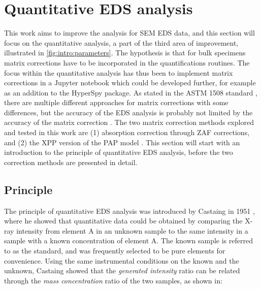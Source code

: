 \section{Quantitative EDS analysis}
\label{theory:quantitative}

This work aims to improve the analysis for SEM EDS data, and this section will focus on the quantitative analysis, a part of the third area of improvement, illustrated in \cref{fig:intro:parameters}.
The hypothesis is that for bulk specimens matrix corrections have to be incorporated in the quantifications routines.
The focus within the quantitative analysis has thus been to implement matrix corrections in a Jupyter notebook which could be developed further, for example as an addition to the HyperSpy package.
As stated in the ASTM 1508 standard \cite{astm_e1508_eds_quantification}, there are multiple different approaches for matrix corrections with some differences, but the accuracy of the EDS analysis is probably not limited by the accuracy of the matrix correction \cite{astm_e1508_eds_quantification}.
The two matrix correction methods explored and tested in this work are (1) absorption correction through ZAF corrections, and (2) the XPP version of the PAP model \cite{pap_1991}.
This section will start with an introduction to the principle of quantitative EDS analysis, before the two correction methods are presented in detail.






\subsection{Principle}
\label{theory:quantitative:principle}

The principle of quantitative EDS analysis was introduced by Castaing in 1951 \cite{castaing_1951}, where he showed that quantitative data could be obtained by comparing the X-ray intensity from element A in an unknown sample to the same intensity in a sample with a known concentration of element A.
The known sample is referred to as the standard, and was frequently selected to be pure elements for convenience.
Using the same instrumental conditions on the known and the unknown, Castaing showed that the \emph{generated intensity} ratio can be related through the \emph{mass concentration} ratio of the two samples, as shown in:



